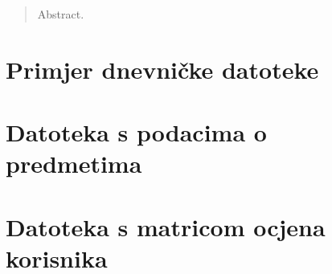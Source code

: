 \documentclass[times, utf8, diplomski, numeric]{fer}
\begin{document}
\begin{abstract}
Abstract.

\end{abstract}

\appendix
\chapter{Primjer dnevničke datoteke}

	
\chapter{Datoteka s podacima o predmetima}


\chapter{Datoteka s matricom ocjena korisnika}

	
\end{document}
